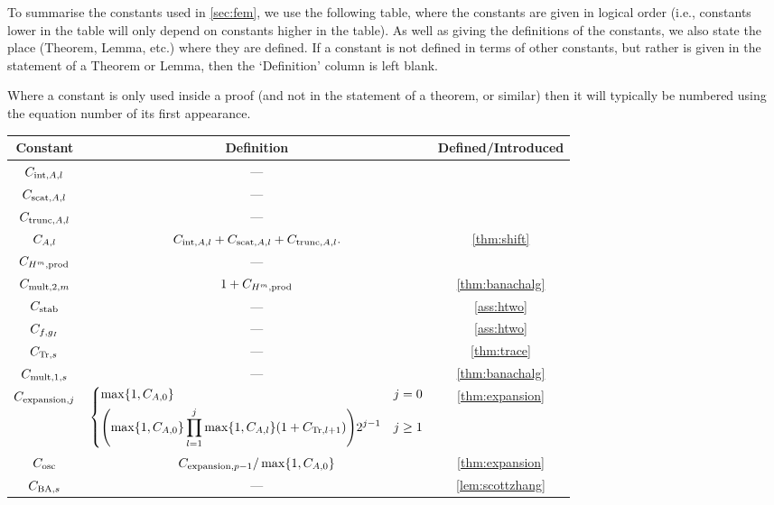 To summarise the constants used in \cref{sec:fem}, we use the following table, where the constants are given in logical order (i.e., constants lower in the table will only depend on constants higher in the table). As well as giving the definitions of the constants, we also state the place (Theorem, Lemma, etc.) where they are defined. If a constant is not defined in terms of other constants, but rather is given in the statement of a Theorem or Lemma, then the `Definition' column is left blank.

Where a constant is only used inside a proof (and not in the statement of a theorem, or similar) then it will typically be numbered using the equation number of its first appearance.

\begin{longtabu}{ccc}
  \toprule
  Constant & Definition & Defined/Introduced\\
  \midrule
  \endhead
  $C_{\mathrm{int},A,l}$ & ---& \cite[Theorem 4.16]{Mc:00}\\
  $C_{\mathrm{scat},A,l}$ & ---& \cite[Theorem 4.18(i)]{Mc:00}\\
    $C_{\mathrm{trunc},A,l}$ & ---& \cite[Theorem 4.18(ii)]{Mc:00}\\
  $C_{A,l}$ & $C_{\mathrm{int},A,l} + C_{\mathrm{scat},A,l} + C_{\mathrm{trunc},A,l}.$ & \cref{thm:shift}\\
  $C_{H^{m},\mathrm{prod}}$&---&\cite[Theorem 3.20]{Mc:00}\\ 
  $C_{\mathrm{mult},2,m}$ &$1+C_{H^{m},\mathrm{prod}}$&\cref{thm:banachalg} \\
  $C_{\mathrm{stab}}$ &---& \cref{ass:htwo}\\
  $C_{f,g_{I}}$ &---& \cref{ass:htwo}\\
  $C_{\mathrm{Tr},s}$ &---& \cref{thm:trace}\\
  $C_{\mathrm{mult},1,s}$ & --- & \cref{thm:banachalg}\\
  $C_{\mathrm{expansion},j}$ & $\displaystyle \begin{dcases}
  \max\set{1,\CAz} & j=0\\
  \mleft(\max\set{1,\CAz} \prod_{l=1}^j \max\set{1,\CAfn{l}} \mleft(1+\CTrfn{l+1}\mright)\mright)2^{j-1} &j \geq 1
  \end{dcases}$& \cref{thm:expansion}\\
  $C_{\mathrm{osc}}$ & $\Cefn{p-1}/\max\set{1,\CAz}$ & \cref{thm:expansion}\\
  $C_{\mathrm{BA},s}$ &---& \cref{lem:scottzhang}\\

\end{longtabu}
